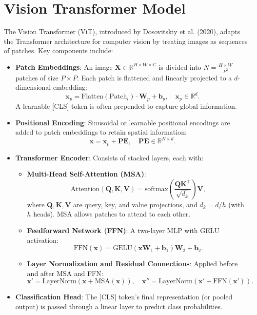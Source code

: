 \documentclass{article}
\begin{document}
\section{Vision Transformer Model}
The Vision Transformer (ViT), introduced by Dosovitskiy et al. (2020), adapts the Transformer architecture for computer vision by treating images as sequences of patches. Key components include:

\begin{itemize}
    \item \textbf{Patch Embeddings}: An image \( \mathbf{X} \in \mathbb{R}^{H \times W \times C} \) is divided into \( N = \frac{H \times W}{P^2} \) patches of size \( P \times P \). Each patch is flattened and linearly projected to a \( d \)-dimensional embedding:
    \[
    \mathbf{x}_p = \text{Flatten}(\text{Patch}_i) \cdot \mathbf{W}_p + \mathbf{b}_p, \quad \mathbf{x}_p \in \mathbb{R}^d.
    \]
    A learnable [CLS] token is often prepended to capture global information.
    \item \textbf{Positional Encoding}: Sinusoidal or learnable positional encodings are added to patch embeddings to retain spatial information:
    \[
    \mathbf{x} = \mathbf{x}_p + \mathbf{PE}, \quad \mathbf{PE} \in \mathbb{R}^{N \times d}.
    \]
    \item \textbf{Transformer Encoder}: Consists of stacked layers, each with:
    \begin{itemize}
        \item \textbf{Multi-Head Self-Attention (MSA)}:
        \[
        \text{Attention}(\mathbf{Q}, \mathbf{K}, \mathbf{V}) = \text{softmax}\left(\frac{\mathbf{Q}\mathbf{K}^\top}{\sqrt{d_k}}\right)\mathbf{V},
        \]
        where \( \mathbf{Q}, \mathbf{K}, \mathbf{V} \) are query, key, and value projections, and \( d_k = d/h \) (with \( h \) heads). MSA allows patches to attend to each other.
        \item \textbf{Feedforward Network (FFN)}: A two-layer MLP with GELU activation:
        \[
        \text{FFN}(\mathbf{x}) = \text{GELU}(\mathbf{xW}_1 + \mathbf{b}_1)\mathbf{W}_2 + \mathbf{b}_2.
        \]
        \item \textbf{Layer Normalization and Residual Connections}: Applied before and after MSA and FFN:
        \[
        \mathbf{x}' = \text{LayerNorm}(\mathbf{x} + \text{MSA}(\mathbf{x})), \quad \mathbf{x}'' = \text{LayerNorm}(\mathbf{x}' + \text{FFN}(\mathbf{x}')).
        \]
    \end{itemize}
    \item \textbf{Classification Head}: The [CLS] token's final representation (or pooled output) is passed through a linear layer to predict class probabilities.
\end{itemize}
\end{document}
